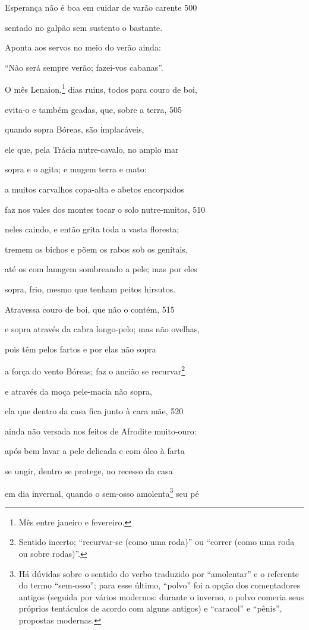 Esperança não é boa em cuidar de varão carente \num{500}

sentado no galpão sem sustento o bastante.

Aponta aos servos no meio do verão ainda:

``Não será sempre verão; fazei-vos cabanas''.

O mês Lenaion,\footnote{Mês entre janeiro e fevereiro.} dias ruins, todos para couro de boi,

evita-o e também geadas, que, sobre a terra, \num{505}

quando sopra Bóreas, são implacáveis,

ele que, pela Trácia nutre-cavalo, no amplo mar

sopra e o agita; e mugem terra e mato:

a muitos carvalhos copa-alta e abetos encorpados

faz nos vales dos montes tocar o solo nutre-muitos, \num{510}

neles caindo, e então grita toda a vasta floresta;

tremem os bichos e põem os rabos sob os genitais,

até os com lanugem sombreando a pele; mas por eles

sopra, frio, mesmo que tenham peitos hirsutos.

Atravessa couro de boi, que não o contém, \num{515}

e sopra através da cabra longo-pelo; mas não ovelhas,

pois têm pelos fartos e por elas não sopra

a força do vento Bóreas; faz o ancião se recurvar\footnote{Sentido incerto; ``recurvar-se (como uma roda)'' ou ``correr (como
uma roda ou sobre rodas)''.}

e através da moça pele-macia não sopra,

ela que dentro da casa fica junto à cara mãe, \num{520}

ainda não versada nos feitos de Afrodite muito-ouro:

após bem lavar a pele delicada e com óleo à farta

se ungir, dentro se protege, no recesso da casa

em dia invernal, quando o sem-osso amolenta\footnote{Há dúvidas sobre o sentido do verbo traduzido por ``amolentar'' e o
referente do termo ``sem-osso''; para esse último, ``polvo'' foi a opção
dos comentadores antigos (seguida por vários modernos: durante o
inverno, o polvo comeria seus próprios tentáculos de acordo com alguns
antigos) e ``caracol'' e ``pênis'', propostas modernas.} seu pé

